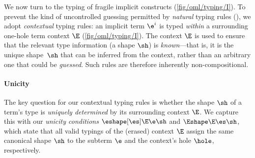 \documentclass[acmsmall,screen,nonacm%
\Anonymous{,anonymous}{}%
\Final{}{,review}%
]{acmart}
\begin{document}

We now turn to the typing of fragile implicit constructs
(\cref{fig/oml/typing/I}). To prevent the kind of uncontrolled guessing
permitted by \emph{natural} typing rules (\eg {}), we adopt
\emph{contextual} typing rules: an implicit term $\e^i$ is typed \emph{within}
a surrounding one-hole term context $\E$ (\cref{fig/oml/typing/I}). The context
$\E$ is used to ensure that the relevant type information (\eg a shape $\sh$)
is \emph{known}---that is, it is the unique shape~$\sh$ that can be inferred
from the context, rather than an arbitrary one that could be \emph{guessed}.
Such rules are therefore inherently non-compositional.

\paragraph{Unicity}


The key question for our contextual typing rules is whether the shape $\sh$ of
a term's type is \emph{uniquely determined} by its surrounding context $\E$. We
capture this with our \emph{unicity conditions} $\eshape[\es] \E \e \sh$ and
$\Eshape \E \es \sh$, which state that all valid typings of the (erased)
context $\E$ assign the same canonical shape $\sh$ to the subterm $\e$ and the
context's hole $\hole$, respectively.
\end{document}
